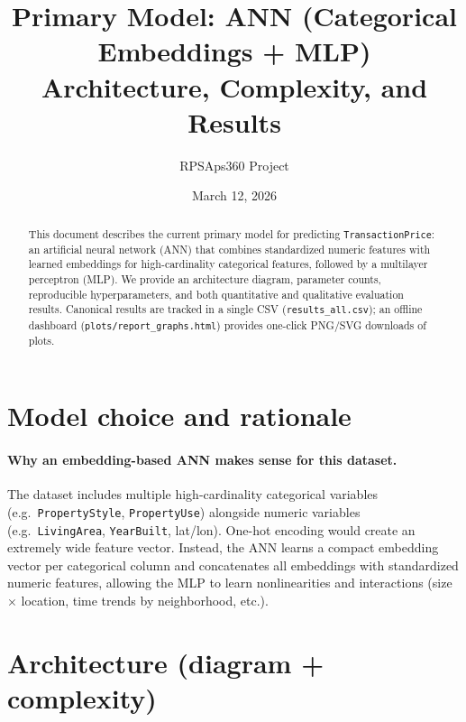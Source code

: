 \documentclass[11pt]{article}
\title{Primary Model: ANN (Categorical Embeddings + MLP)\\
\large Architecture, Complexity, and Results}
\author{RPSAps360 Project}
\date{March 12, 2026}
\begin{document}
\maketitle

\begin{abstract}
This document describes the current primary model for predicting \texttt{TransactionPrice}: an artificial neural network (ANN) that combines standardized numeric features with learned embeddings for high-cardinality categorical features, followed by a multilayer perceptron (MLP). We provide an architecture diagram, parameter counts, reproducible hyperparameters, and both quantitative and qualitative evaluation results. Canonical results are tracked in a single CSV (\texttt{results\_all.csv}); an offline dashboard (\texttt{plots/report\_graphs.html}) provides one-click PNG/SVG downloads of plots.
\end{abstract}

\tableofcontents
\newpage

\section{Model choice and rationale}
\paragraph{Why an embedding-based ANN makes sense for this dataset.}
The dataset includes multiple high-cardinality categorical variables (e.g.\ \texttt{PropertyStyle}, \texttt{PropertyUse}) alongside numeric variables (e.g.\ \texttt{LivingArea}, \texttt{YearBuilt}, lat/lon). One-hot encoding would create an extremely wide feature vector. Instead, the ANN learns a compact embedding vector per categorical column and concatenates all embeddings with standardized numeric features, allowing the MLP to learn nonlinearities and interactions (size \(\times\) location, time trends by neighborhood, etc.).

\section{Architecture (diagram + complexity)}
\end{document}

